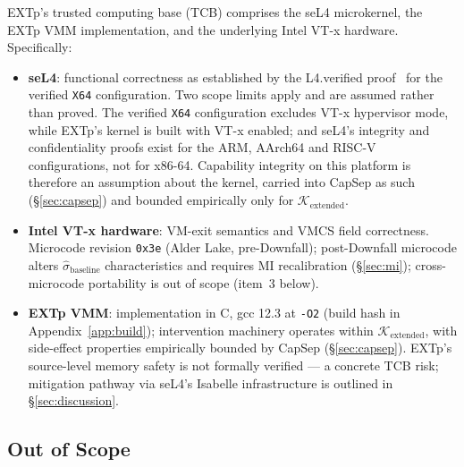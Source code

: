 \documentclass[conference]{IEEEtran}
\newcommand{\Kextended}{\mathcal{K}_\text{extended}}
\newcommand{\sigbase}{\hat{\sigma}_\text{baseline}}
\begin{document}
EXTp's trusted computing base (TCB) comprises the seL4 microkernel,
the EXTp VMM implementation, and the underlying Intel VT-x hardware.
Specifically:
\begin{itemize}
\item \textbf{seL4}: functional correctness as established by the
  L4.verified proof~\cite{klein2009sel4,klein2014sel4} for the
  verified \texttt{X64} configuration. Two scope limits apply and are
  assumed rather than proved. The verified \texttt{X64} configuration
  excludes VT-x hypervisor mode, while EXTp's kernel is built with
  VT-x enabled; and seL4's integrity and confidentiality proofs exist
  for the ARM, AArch64 and RISC-V configurations, not for x86-64.
  Capability integrity on this platform is therefore an assumption
  about the kernel, carried into CapSep as such (\S\ref{sec:capsep})
  and bounded empirically only for $\Kextended$.
\item \textbf{Intel VT-x hardware}: VM-exit semantics and VMCS field
  correctness. Microcode revision \texttt{0x3e} (Alder Lake,
  pre-Downfall); post-Downfall microcode alters $\sigbase$
  characteristics and requires MI recalibration (\S\ref{sec:mi});
  cross-microcode portability is out of scope (item~3 below).
\item \textbf{EXTp VMM}: implementation in C, gcc 12.3 at
  \texttt{-O2} (build hash in Appendix~\ref{app:build}); intervention
  machinery operates within $\Kextended$, with side-effect properties
  empirically bounded by CapSep (\S\ref{sec:capsep}). EXTp's
  source-level memory safety is not formally verified --- a concrete
  TCB risk; mitigation pathway via seL4's Isabelle infrastructure is
  outlined in \S\ref{sec:discussion}.
\end{itemize}

\subsection*{Out of Scope}
\end{document}
